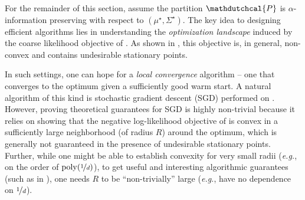 \documentclass[11pt,letterpaper]{article}
\makeatletter
\theoremstyle{plain}
\theoremstyle{definition}
\theoremstyle{remark}
\renewcommand{\eqref}[1]{\textup{\eqrefform@{\ref{#1}}}}
\let\eqrefform@\tagform@
\newcommand{\nfrac}[2]{\nicefrac{#1}{#2}}
\newcommand{\poly}{\mathrm{poly}}
\newcommand{\eg}{\emph{e.g.}}
\newcommand{\hypo}[1]{\mathdutchcal{#1}}
\newcommand{\hyP}{\hypo{P}}
\newcommand{\muStar}{{\mu^\star}}
\newcommand{\SigmaStar}{{\Sigma^\star}}
\newcommand{\negsep}{\vspace{0mm}}
\makeatother
\begin{document}
{For the remainder of this section, assume} the partition $\hyP$ is $\alpha$-information preserving with respect to $(\muStar, \SigmaStar)$. The key idea to designing efficient algorithms lies in understanding the \emph{optimization landscape} induced by the coarse likelihood objective of \eqref{eq:NLL-intro}. As shown in , this objective is, in general, {non-convex} and contains undesirable stationary points.

In such settings, one can hope for a \emph{local convergence} algorithm -- one that converges to the optimum given a sufficiently good warm start.
A natural algorithm of this kind is stochastic gradient descent (SGD) performed on \eqref{eq:NLL-intro}.  
However, proving theoretical guarantees for {SGD} is highly non-trivial because it relies on showing that the negative log-likelihood objective of \eqref{eq:NLL-intro} is convex {in a sufficiently large neighborhood (of radius \(R\)) around the optimum}, {which is generally not guaranteed in the presence of undesirable stationary points}. 
{Further, while one might be able to establish convexity for very small radii (\eg{}, on the order of \(\poly(\nfrac{1}{d})\)),} to get useful and interesting algorithmic guarantees (such as in ), one needs $R$ to be ``non-trivially'' large (\eg{}, have no dependence on $\nfrac{1}{d}$).
 
\negsep{}
\end{document}
